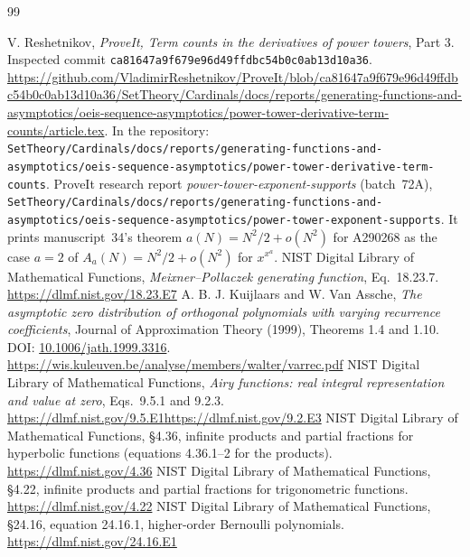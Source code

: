 \documentclass[11pt,a4paper]{article}
\numberwithin{equation}{section}
\begin{document}
\clearpage
\begin{thebibliography}{99}\raggedright
{}V. Reshetnikov, \emph{ProveIt, Term counts in the derivatives of power towers}, Part 3. Inspected commit \texttt{ca81647a9f679e96d49ffdbc54b0c0ab13d10a36}.\\
\url{https://github.com/VladimirReshetnikov/ProveIt/blob/ca81647a9f679e96d49ffdbc54b0c0ab13d10a36/SetTheory/Cardinals/docs/reports/generating-functions-and-asymptotics/oeis-sequence-asymptotics/power-tower-derivative-term-counts/article.tex}. In the repository: \nolinkurl{SetTheory/Cardinals/docs/reports/generating-functions-and-asymptotics/oeis-sequence-asymptotics/power-tower-derivative-term-counts}.
ProveIt research report \emph{power-tower-exponent-supports} (batch~72A), \nolinkurl{SetTheory/Cardinals/docs/reports/generating-functions-and-asymptotics/oeis-sequence-asymptotics/power-tower-exponent-supports}. It prints manuscript~34's theorem $a(N)=N^2/2+o(N^2)$ for A290268 as the case $a=2$ of $A_a(N)=N^2/2+o(N^2)$ for $x^{x^a}$.
NIST Digital Library of Mathematical Functions, \emph{Meixner--Pollaczek generating function}, Eq.~18.23.7.\\\url{https://dlmf.nist.gov/18.23.E7}
A. B. J. Kuijlaars and W. Van Assche, \emph{The asymptotic zero distribution of orthogonal polynomials with varying recurrence coefficients}, Journal of Approximation Theory (1999), Theorems 1.4 and 1.10. DOI: \href{https://doi.org/10.1006/jath.1999.3316}{10.1006/jath.1999.3316}.\\\url{https://wis.kuleuven.be/analyse/members/walter/varrec.pdf}
NIST Digital Library of Mathematical Functions, \emph{Airy functions: real integral representation and value at zero}, Eqs.~9.5.1 and 9.2.3.\\
\url{https://dlmf.nist.gov/9.5.E1}\quad\url{https://dlmf.nist.gov/9.2.E3}
NIST Digital Library of Mathematical Functions, \S4.36, infinite products and partial fractions for hyperbolic functions (equations 4.36.1--2 for the products).\\\url{https://dlmf.nist.gov/4.36}
NIST Digital Library of Mathematical Functions, \S4.22, infinite products and partial fractions for trigonometric functions.\\\url{https://dlmf.nist.gov/4.22}
NIST Digital Library of Mathematical Functions, \S24.16, equation 24.16.1, higher-order Bernoulli polynomials.\\\url{https://dlmf.nist.gov/24.16.E1}

\end{thebibliography}
\end{document}
